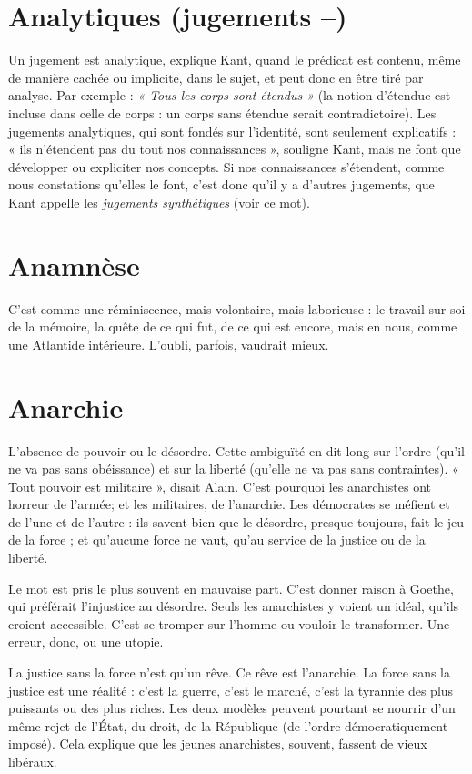 \section{Analytiques (jugements {\bf --})}
Un jugement est analytique, explique Kant,
quand le prédicat est contenu, même de
manière cachée ou implicite, dans le sujet, et peut donc en être tiré par analyse.
Par exemple : {\it « Tous les corps sont étendus »} (la notion d’étendue est incluse dans
celle de corps : un corps sans étendue serait contradictoire). Les jugements analytiques,
qui sont fondés sur l'identité, sont seulement explicatifs : « ils n’étendent
pas du tout nos connaissances », souligne Kant, mais ne font que développer
ou expliciter nos concepts. Si nos connaissances s'étendent, comme
nous constations qu’elles le font, c’est donc qu’il y a d’autres jugements, que
Kant appelle les {\it jugements synthétiques} (voir ce mot).

\section{Anamnèse}
C’est comme une réminiscence, mais volontaire, mais laborieuse :
le travail sur soi de la mémoire, la quête de ce qui fut,
de ce qui est encore, mais en nous, comme une Atlantide intérieure. L’oubli,
parfois, vaudrait mieux.

\section{Anarchie}
L'absence de pouvoir ou le désordre. Cette ambiguïté en dit
long sur l’ordre (qu’il ne va pas sans obéissance) et sur la liberté
(qu’elle ne va pas sans contraintes). « Tout pouvoir est militaire », disait Alain.
C’est pourquoi les anarchistes ont horreur de l’armée; et les militaires, de
l'anarchie. Les démocrates se méfient et de l’une et de l’autre : ils savent bien
que le désordre, presque toujours, fait le jeu de la force ; et qu'aucune force ne
vaut, qu’au service de la justice ou de la liberté.

Le mot est pris le plus souvent en mauvaise part. C’est donner raison à
Goethe, qui préférait l'injustice au désordre. Seuls les anarchistes y voient un
idéal, qu’ils croient accessible. C’est se tromper sur l’homme ou vouloir le
transformer. Une erreur, donc, ou une utopie.

La justice sans la force n’est qu’un rêve. Ce rêve est l’anarchie. La force sans
la justice est une réalité : c’est la guerre, c’est le marché, c’est la tyrannie des
plus puissants ou des plus riches. Les deux modèles peuvent pourtant se nourrir
d’un même rejet de l’État, du droit, de la République (de l’ordre démocratiquement
imposé). Cela explique que les jeunes anarchistes, souvent, fassent de
vieux libéraux.

